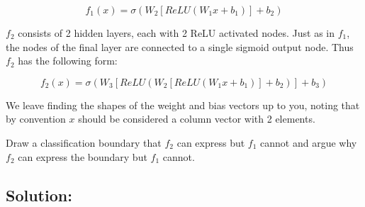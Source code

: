 \documentclass[submit]{harvardml}
\begin{document}
\begin{framed}
\begin{enumerate}
        $$
        f_1(x) = \sigma\left( W_2[ReLU(W_1 x + b_1)] + b_2 \right)
        $$
    
        $f_2$ consists of 2 hidden layers, each with 2 ReLU activated nodes. Just as in $f_1$, the 
        nodes of the final layer are connected to a single sigmoid output node. 
        Thus $f_2$ has the following form:
    
        $$
        f_2(x) = \sigma(W_3[ReLU(W_2[ReLU(W_1 x + b_1)]+b_2)]+ b_3)
        $$
    
        We leave finding the shapes of the weight and bias vectors up to you, noting that 
        by convention $x$ should be considered a column vector with 2 elements. 
    
        Draw a classification boundary that $f_2$ can express but $f_1$ cannot and argue 
        why $f_2$ can express the boundary but $f_1$ cannot.
    
    
    \end{enumerate}  
\end{framed}

\subsection*{Solution:}
\end{document}
